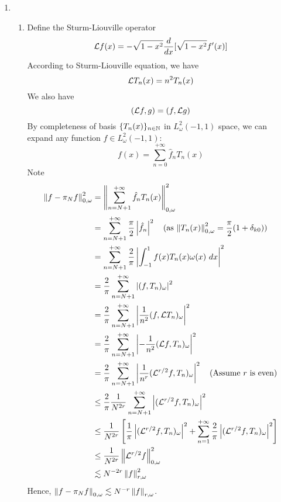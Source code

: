 \documentclass[a4paper,8pt]{article}
\begin{document}
\newpage
\begin{enumerate}[label=Q\arabic	*.]
\setlength{\itemsep}{0pt}
\setcounter{enumi}{2}
\item 
\begin{enumerate}[label=(\alph*)]
\setlength{\itemsep}{0pt}
\item Define the Sturm-Liouville operator
\begin{equation}
\mathcal{L} f(x) = - \sqrt{1 - x^2} \frac{d}{dx} [\sqrt{1-x^2} f'(x)] \nonumber
\end{equation}
According to Sturm-Liouville equation, we have
\begin{equation}
\mathcal{L} T_n(x) = n^2 T_n(x) \nonumber
\end{equation}
We also have
\begin{equation}
(\mathcal{L} f, g) = (f, \mathcal{L} g) \nonumber
\end{equation}
By completeness of basis $\{T_n(x)\}_{n \in \mathbb{N}}$ in $L^2_{\omega} (-1, 1)$ space, we can expand any function $f \in L^2_{\omega} (-1, 1)$:
\begin{equation}
f(x) = \sum\limits_{n = 0}^{+ \infty} \hat{f}_n T_n(x) \nonumber
\end{equation}
Note
\begin{align}
\left\lVert f - \pi_N f\right\rVert^2_{0, \omega} &= \left\lVert\sum\limits_{n = N+1}^{+ \infty} \hat{f}_n T_n (x)\right\rVert^2_{0,\omega} \nonumber \\
&= \sum\limits_{n = N+1}^{+ \infty} \frac{\pi}{2} \left\lvert\hat{f}_n\right\rvert^2 \ \ \ \text{(as $\left\lVert T_n(x)\right\rVert^2_{0, \omega} = \frac{\pi}{2}(1+\delta_{k0})$)}\nonumber \\
&= \sum\limits_{n = N+1}^{+ \infty} \frac{2}{\pi} \left\lvert\int_{-1}^1 f(x) T_n(x) \omega(x) \ dx\right\rvert^2 \nonumber \\
&= \frac{2}{\pi} \sum\limits_{n = N+1}^{+ \infty} \left\lvert(f, T_n)_{\omega}\right\rvert^2 \nonumber \\
&= \frac{2}{\pi} \sum\limits_{n = N+1}^{+ \infty} \left\lvert\frac{1}{n^2}(f, \mathcal{L} T_n)_{\omega}\right\rvert^2 \nonumber \\
&= \frac{2}{\pi} \sum\limits_{n = N+1}^{+ \infty} \left\lvert-\frac{1}{n^2}(\mathcal{L} f, T_n)_{\omega}\right\rvert^2 \nonumber \\
&= \frac{2}{\pi} \sum\limits_{n = N+1}^{+ \infty} \left\lvert\frac{1}{n^r}(\mathcal{L}^{r/2} f, T_n)_{\omega}\right\rvert^2 \ \ \ \text{(Assume $r$ is even)}\nonumber \\
&\leq \frac{2}{\pi} \frac{1}{N^{2r}} \sum\limits_{n = N+1}^{+ \infty}  \left\lvert(\mathcal{L}^{r/2} f, T_n)_{\omega}\right\rvert^2 \nonumber \\
&\leq \frac{1}{N^{2r}} \left[\frac{1}{\pi} \left\lvert(\mathcal{L}^{r/2} f, T_n)_{\omega}\right\rvert^2 + \sum\limits_{n=1}^{+ \infty} \frac{2}{\pi} \left\lvert(\mathcal{L}^{r/2} f, T_n)_{\omega}\right\rvert^2 \right] \nonumber \\
&\leq \frac{1}{N^{2r}} \left\lVert\mathcal{L}^{r/2} f\right\rVert^2_{0, \omega	} \nonumber \\
&\lesssim N^{-{2r}} \left\lVert f\right\rVert^2_{r,\omega} \nonumber
\end{align}
Hence, $\left\lVert f - \pi_N f\right\rVert_{0, \omega} \lesssim N^{-{r}} \left\lVert f\right\rVert_{r,\omega}$.
\end{enumerate}
\end{enumerate}
\end{document}
